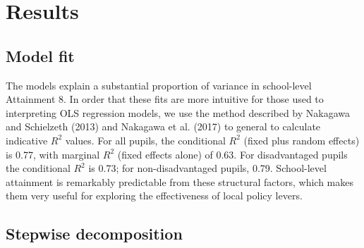 \documentclass[
  12pt,
  titlepage]{article}
\begin{document}
\section{Results}\label{results}

\subsection{Model fit}\label{model-fit}

The models explain a substantial proportion of variance in school-level
Attainment 8. In order that these fits are more intuitive for those used
to interpreting OLS regression models, we use the method described by
Nakagawa and Schielzeth (2013) and Nakagawa et al. (2017) to general to
calculate indicative \(R^2\) values. For all pupils, the conditional
\(R^2\) (fixed plus random effects) is 0.77, with marginal \(R^2\)
(fixed effects alone) of 0.63. For disadvantaged pupils the conditional
\(R^2\) is 0.73; for non-disadvantaged pupils, 0.79. School-level
attainment is remarkably predictable from these structural factors,
which makes them very useful for exploring the effectiveness of local
policy levers.

\subsection{Stepwise decomposition}\label{stepwise-decomposition}
\end{document}
